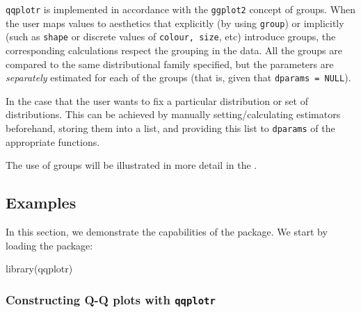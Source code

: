 \texttt{qqplotr} is implemented in accordance with the \texttt{ggplot2}
concept of groups. When the user maps values to aesthetics that
explicitly (by using \texttt{group}) or implicitly (such as
\texttt{shape} or discrete values of \texttt{colour,\ size}, etc)
introduce groups, the corresponding calculations respect the grouping in
the data. All the groups are compared to the same distributional family
specified, but the parameters are \emph{separately} estimated for each
of the groups (that is, given that \texttt{dparams\ =\ NULL}).

In the case that the user wants to fix a particular distribution or set
of distributions. This can be achieved by manually setting/calculating
estimators beforehand, storing them into a list, and providing this list
to \texttt{dparams} of the appropriate  functions.

The use of groups will be illustrated in more detail in the
.

\FloatBarrier

\subsection{Examples}\label{examples}

\label{sec:examples}

In this section, we demonstrate the capabilities of the 
package. We start by loading the package:

\begin{Schunk}
\begin{Sinput}
library(qqplotr)
\end{Sinput}
\end{Schunk}

\subsubsection{\texorpdfstring{Constructing Q-Q plots with
\texttt{qqplotr}}{Constructing Q-Q plots with qqplotr}}\label{constructing-q-q-plots-with-qqplotr}


